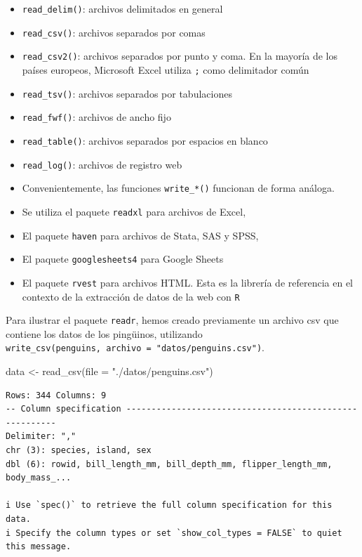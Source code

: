 \documentclass[
  letterpaper,
  DIV=11,
  numbers=noendperiod]{scrreprt}
\newenvironment{Shaded}{\begin{snugshade}}{\end{snugshade}}
\newcommand{\AttributeTok}[1]{\textcolor[rgb]{0.40,0.45,0.13}{#1}}
\newcommand{\FunctionTok}[1]{\textcolor[rgb]{0.28,0.35,0.67}{#1}}
\newcommand{\NormalTok}[1]{\textcolor[rgb]{0.00,0.23,0.31}{#1}}
\newcommand{\OtherTok}[1]{\textcolor[rgb]{0.00,0.23,0.31}{#1}}
\newcommand{\StringTok}[1]{\textcolor[rgb]{0.13,0.47,0.30}{#1}}
\begin{document}
\begin{itemize}
\item
  \texttt{read\_delim()}: archivos delimitados en general
\item
  \texttt{read\_csv()}: archivos separados por comas
\item
  \texttt{read\_csv2()}: archivos separados por punto y coma. En la
  mayoría de los países europeos, Microsoft Excel utiliza \texttt{;}
  como delimitador común
\item
  \texttt{read\_tsv()}: archivos separados por tabulaciones
\item
  \texttt{read\_fwf()}: archivos de ancho fijo
\item
  \texttt{read\_table()}: archivos separados por espacios en blanco
\item
  \texttt{read\_log()}: archivos de registro web
\item
  Convenientemente, las funciones \texttt{write\_*()} funcionan de forma
  análoga.
\item
  Se utiliza el paquete \texttt{readxl} para archivos de Excel,
\item
  El paquete \texttt{haven} para archivos de Stata, SAS y SPSS,
\item
  El paquete \texttt{googlesheets4} para Google Sheets
\item
  El paquete \texttt{rvest} para archivos HTML. Esta es la librería de
  referencia en el contexto de la extracción de datos de la web con
  \texttt{R}
\end{itemize}

Para ilustrar el paquete \texttt{readr}, hemos creado previamente un
archivo csv que contiene los datos de los pingüinos, utilizando
\texttt{write\_csv(penguins,\ archivo\ =\ "datos/penguins.csv")}.

\begin{Shaded}
\begin{Highlighting}[]
\NormalTok{data }\OtherTok{\textless{}{-}} \FunctionTok{read\_csv}\NormalTok{(}\AttributeTok{file =} \StringTok{"./datos/penguins.csv"}\NormalTok{)}
\end{Highlighting}
\end{Shaded}

\begin{verbatim}
Rows: 344 Columns: 9
-- Column specification --------------------------------------------------------
Delimiter: ","
chr (3): species, island, sex
dbl (6): rowid, bill_length_mm, bill_depth_mm, flipper_length_mm, body_mass_...

i Use `spec()` to retrieve the full column specification for this data.
i Specify the column types or set `show_col_types = FALSE` to quiet this message.
\end{verbatim}
\end{document}
